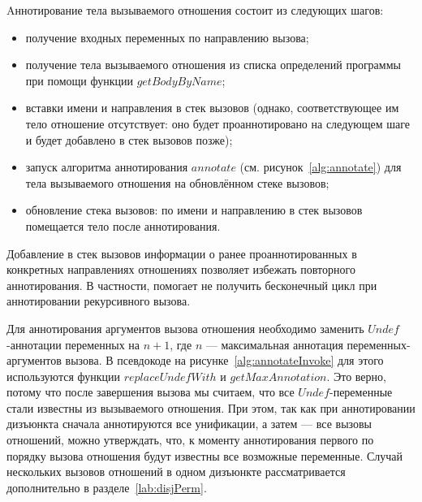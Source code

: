 Aннотирование тела вызываемого отношения состоит из следующих шагов:
\begin{itemize}
    \item получение входных переменных по направлению вызова;
    \item получение тела вызываемого отношения из списка определений программы при помощи функции $getBodyByName$;
    \item вставки имени и направления в стек вызовов (однако, соответствующее им тело отношение отсутствует: оно будет проаннотировано на следующем шаге и будет добавлено в стек вызовов позже);
    \item запуск алгоритма аннотирования $annotate$ (см. рисунок~\ref{alg:annotate}) для тела вызываемого отношения на обновлённом стеке вызовов;
    \item обновление стека вызовов: по имени и направлению в стек вызовов помещается тело после аннотирования.
\end{itemize}

Добавление в стек вызовов информации о ранее проаннотированных в конкретных направлениях отношениях позволяет избежать повторного аннотирования.
В частности, помогает не получить бесконечный цикл при аннотировании рекурсивного вызова.

Для аннотирования аргументов вызова отношения необходимо заменить $Undef$-аннотации переменных на $n+1$, где $n$ --- максимальная аннотация переменных-аргументов вызова.
В псевдокоде на рисунке~\ref{alg:annotateInvoke} для этого используются функции $replaceUndefWith$ и $getMaxAnnotation$.
Это верно, потому что после завершения вызова мы считаем, что все $Undef$-переменные стали известны из вызываемого отношения.
При этом, так как при аннотировании дизъюнкта сначала аннотируются все унификации, а затем --- все вызовы отношений, можно утверждать, что, к моменту аннотирования первого по порядку вызова отношения будут известны все возможные переменные.
Случай нескольких вызовов отношений в одном дизъюнкте рассматривается дополнительно в разделе~\ref{lab:disjPerm}.
